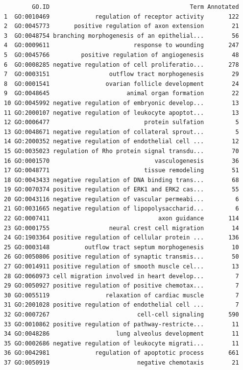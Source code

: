 \documentclass[]{article}
\begin{document}
\begin{verbatim}
        GO.ID                                        Term Annotated
1  GO:0010469             regulation of receptor activity       122
2  GO:0045773       positive regulation of axon extension        21
3  GO:0048754 branching morphogenesis of an epithelial...        56
4  GO:0009611                        response to wounding       247
5  GO:0045766         positive regulation of angiogenesis        48
6  GO:0008285 negative regulation of cell proliferatio...       278
7  GO:0003151                 outflow tract morphogenesis        29
8  GO:0001541                ovarian follicle development        24
9  GO:0048645                      animal organ formation        22
10 GO:0045992 negative regulation of embryonic develop...        13
11 GO:2000107 negative regulation of leukocyte apoptot...        13
12 GO:0006477                           protein sulfation         5
13 GO:0048671 negative regulation of collateral sprout...         5
14 GO:2000352 negative regulation of endothelial cell ...        12
15 GO:0035023 regulation of Rho protein signal transdu...        70
16 GO:0001570                              vasculogenesis        36
17 GO:0048771                           tissue remodeling        51
18 GO:0043433 negative regulation of DNA binding trans...        68
19 GO:0070374 positive regulation of ERK1 and ERK2 cas...        55
20 GO:0043116 negative regulation of vascular permeabi...         6
21 GO:0031665 negative regulation of lipopolysaccharid...         6
22 GO:0007411                               axon guidance       114
23 GO:0001755                 neural crest cell migration        14
24 GO:1903364 positive regulation of cellular protein ...       136
25 GO:0003148          outflow tract septum morphogenesis        10
26 GO:0050806 positive regulation of synaptic transmis...        50
27 GO:0014911 positive regulation of smooth muscle cel...        13
28 GO:0060973 cell migration involved in heart develop...         7
29 GO:0050927 positive regulation of positive chemotax...         7
30 GO:0055119                relaxation of cardiac muscle         7
31 GO:2001028 positive regulation of endothelial cell ...         7
32 GO:0007267                         cell-cell signaling       590
33 GO:0010862 positive regulation of pathway-restricte...        11
34 GO:0048286                   lung alveolus development        11
35 GO:0002686 negative regulation of leukocyte migrati...        11
36 GO:0042981             regulation of apoptotic process       661
37 GO:0050919                         negative chemotaxis        21

\end{verbatim}
\end{document}
